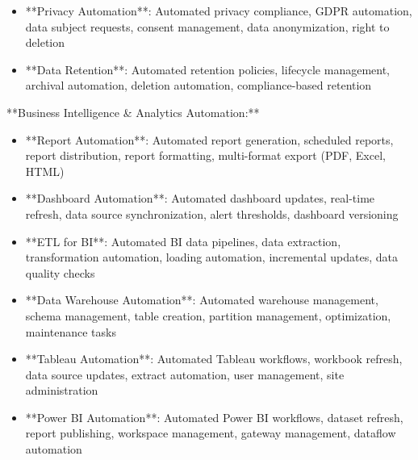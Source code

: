 \documentclass[11pt,a4paper]{article}
\begin{document}
\begin{itemize}
\item **Privacy Automation**: Automated privacy compliance, GDPR automation, data subject requests, consent management, data anonymization, right to deletion
\end{itemize}

\begin{itemize}
\item **Data Retention**: Automated retention policies, lifecycle management, archival automation, deletion automation, compliance-based retention
\end{itemize}

**Business Intelligence \& Analytics Automation:**

\begin{itemize}
\item **Report Automation**: Automated report generation, scheduled reports, report distribution, report formatting, multi-format export (PDF, Excel, HTML)
\end{itemize}

\begin{itemize}
\item **Dashboard Automation**: Automated dashboard updates, real-time refresh, data source synchronization, alert thresholds, dashboard versioning
\end{itemize}

\begin{itemize}
\item **ETL for BI**: Automated BI data pipelines, data extraction, transformation automation, loading automation, incremental updates, data quality checks
\end{itemize}

\begin{itemize}
\item **Data Warehouse Automation**: Automated warehouse management, schema management, table creation, partition management, optimization, maintenance tasks
\end{itemize}

\begin{itemize}
\item **Tableau Automation**: Automated Tableau workflows, workbook refresh, data source updates, extract automation, user management, site administration
\end{itemize}

\begin{itemize}
\item **Power BI Automation**: Automated Power BI workflows, dataset refresh, report publishing, workspace management, gateway management, dataflow automation
\end{itemize}
\end{document}
